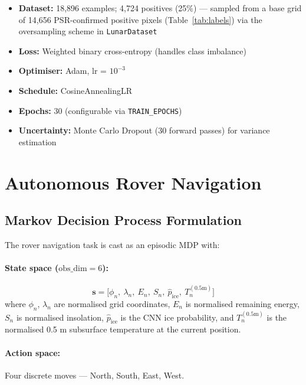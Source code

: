 \documentclass[12pt,a4paper]{article}
\begin{document}
\begin{itemize}
  \item \textbf{Dataset:} 18{,}896 examples; 4{,}724 positives (25\%) — sampled
    from a base grid of 14{,}656 PSR-confirmed positive pixels (Table~\ref{tab:labels})
    via the oversampling scheme in \texttt{LunarDataset}
  \item \textbf{Loss:} Weighted binary cross-entropy (handles class imbalance)
  \item \textbf{Optimiser:} Adam, lr = $10^{-3}$
  \item \textbf{Schedule:} CosineAnnealingLR
  \item \textbf{Epochs:} 30 (configurable via \texttt{TRAIN\_EPOCHS})
  \item \textbf{Uncertainty:} Monte Carlo Dropout (30 forward passes) for variance estimation
\end{itemize}

\section{Autonomous Rover Navigation}

\subsection{Markov Decision Process Formulation}

The rover navigation task is cast as an episodic MDP with:

\paragraph{State space ($\text{obs\_dim} = 6$):}
\begin{equation}
  \mathbf{s} = \bigl[\phi_n,\ \lambda_n,\ E_n,\ S_n,\ \hat{p}_\text{ice},\ T^{(0.5\text{m})}_n\bigr]
\end{equation}
where $\phi_n$, $\lambda_n$ are normalised grid coordinates, $E_n$ is normalised
remaining energy, $S_n$ is normalised insolation, $\hat{p}_\text{ice}$ is the CNN
ice probability, and $T^{(0.5\text{m})}_n$ is the normalised 0.5 m subsurface
temperature at the current position.

\paragraph{Action space:} Four discrete moves — North, South, East, West.
\end{document}
